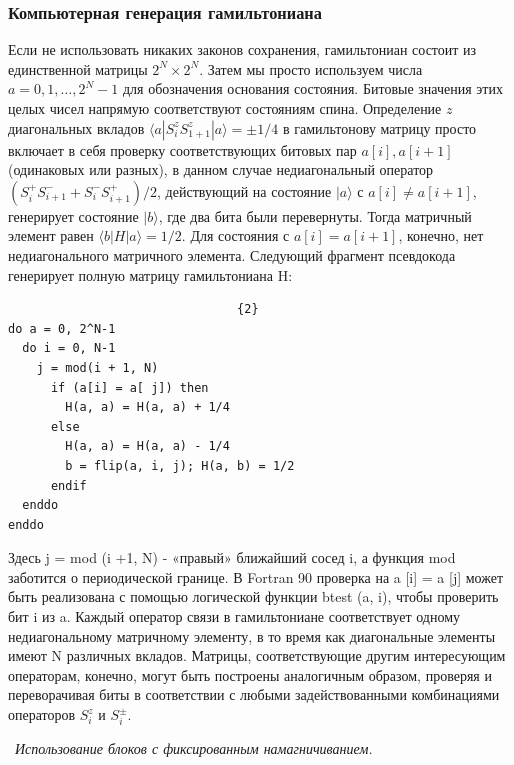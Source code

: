 \documentclass[11pt]{article}
\begin{document}
\subsubsection{Компьютерная генерация гамильтониана}
Если не использовать никаких законов сохранения, гамильтониан состоит из единственной матрицы $2^N × 2^N$. Затем мы просто используем числа $a = 0, 1,\dots, 2^N - 1$ для обозначения основания состояния. Битовые значения этих целых чисел напрямую соответствуют состояниям спина. Определение $z$ диагональных вкладов $\langle a | S_i^z S_{1 + 1}^z | a \rangle = \pm 1/4$ в гамильтонову матрицу просто включает в себя проверку соответствующих битовых пар $a[i], a [i + 1]$ (одинаковых или разных), в данном случае недиагональный оператор $(S_i^{+} S_{i+1}^{-}+S_i^{-}S_{i+1}^{+}) / 2$, действующий на состояние $| a \rangle$ с $a [i] \ne a [i + 1]$, генерирует состояние $| b \rangle $, где два бита были перевернуты. Тогда матричный элемент равен $\langle b | H | a \rangle = 1/2$. Для состояния с $a[i] = a [i + 1]$, конечно, нет недиагонального матричного элемента. Следующий фрагмент псевдокода генерирует полную матрицу гамильтониана H:

\begin{lstlisting}                                {2}
do a = 0, 2^N-1
  do i = 0, N-1
    j = mod(i + 1, N)
      if (a[i] = a[ j]) then
        H(a, a) = H(a, a) + 1/4
      else
        H(a, a) = H(a, a) - 1/4
        b = flip(a, i, j); H(a, b) = 1/2
      endif
  enddo
enddo
\end{lstlisting}

Здесь j = mod (i +1, N) - «правый» ближайший сосед i, а функция mod заботится о периодической границе. В Fortran 90 проверка на a [i] = a [j] может быть реализована с помощью логической функции btest (a, i), чтобы проверить бит i из a. Каждый оператор связи в гамильтониане соответствует одному недиагональному матричному элементу, в то время как диагональные элементы имеют N различных вкладов. Матрицы, соответствующие другим интересующим операторам, конечно, могут быть построены аналогичным образом, проверяя и переворачивая биты в соответствии с любыми задействованными комбинациями операторов $S_i^z$ и $S_i^{\pm}$.

~\emph{Использование блоков с фиксированным намагничиванием.}
\end{document}
